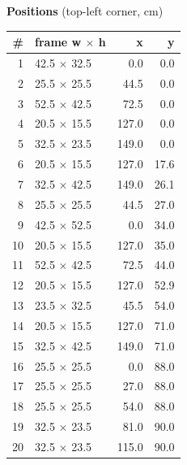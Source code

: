 \documentclass[a4paper,landscape,10pt]{article}
\begin{document}
\begin{minipage}[t]{0.25\textwidth}
\vspace{8pt}
{\bfseries Positions} (top-left corner, cm)\\[2pt]
\tiny
\begin{tabular}{@{}r l r r@{}}
\toprule
\# & frame w $\times$ h & x & y \\
\midrule
1 & 42.5 $\times$ 32.5 & 0.0 & 0.0 \\
2 & 25.5 $\times$ 25.5 & 44.5 & 0.0 \\
3 & 52.5 $\times$ 42.5 & 72.5 & 0.0 \\
4 & 20.5 $\times$ 15.5 & 127.0 & 0.0 \\
5 & 32.5 $\times$ 23.5 & 149.0 & 0.0 \\
6 & 20.5 $\times$ 15.5 & 127.0 & 17.6 \\
7 & 32.5 $\times$ 42.5 & 149.0 & 26.1 \\
8 & 25.5 $\times$ 25.5 & 44.5 & 27.0 \\
9 & 42.5 $\times$ 52.5 & 0.0 & 34.0 \\
10 & 20.5 $\times$ 15.5 & 127.0 & 35.0 \\
11 & 52.5 $\times$ 42.5 & 72.5 & 44.0 \\
12 & 20.5 $\times$ 15.5 & 127.0 & 52.9 \\
13 & 23.5 $\times$ 32.5 & 45.5 & 54.0 \\
14 & 20.5 $\times$ 15.5 & 127.0 & 71.0 \\
15 & 32.5 $\times$ 42.5 & 149.0 & 71.0 \\
16 & 25.5 $\times$ 25.5 & 0.0 & 88.0 \\
17 & 25.5 $\times$ 25.5 & 27.0 & 88.0 \\
18 & 25.5 $\times$ 25.5 & 54.0 & 88.0 \\
19 & 32.5 $\times$ 23.5 & 81.0 & 90.0 \\
20 & 32.5 $\times$ 23.5 & 115.0 & 90.0 \\
\bottomrule
\end{tabular}
\end{minipage}
\clearpage
\end{document}
